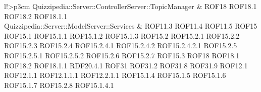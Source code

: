 \begin{tabella}{l!{\VRule}>{\centering\arraybackslash}p{3cm}}
Quizzipedia::Server::ControllerServer::TopicManager & ROF18 \linebreak ROF18.1 \linebreak ROF18.2 \linebreak ROF18.1.1 \\
Quizzipedia::Server::ModelServer::Services & ROF11.3 \linebreak ROF11.4 \linebreak ROF11.5 \linebreak ROF15 \linebreak ROF15.1 \linebreak ROF15.1.1 \linebreak ROF15.1.2 \linebreak ROF15.1.3 \linebreak ROF15.2 \linebreak ROF15.2.1 \linebreak ROF15.2.2 \linebreak ROF15.2.3 \linebreak ROF15.2.4 \linebreak ROF15.2.4.1 \linebreak ROF15.2.4.2 \linebreak ROF15.2.4.2.1 \linebreak ROF15.2.5 \linebreak ROF15.2.5.1 \linebreak ROF15.2.5.2 \linebreak ROF15.2.6 \linebreak ROF15.2.7 \linebreak ROF15.3 \linebreak ROF18 \linebreak ROF18.1 \linebreak ROF18.2 \linebreak ROF18.1.1 \linebreak RDF20.4.1 \linebreak ROF31 \linebreak ROF31.2 \linebreak ROF31.8 \linebreak ROF31.9 \linebreak ROF12.1 \linebreak ROF12.1.1 \linebreak ROF12.1.1.1 \linebreak ROF12.2.1.1 \linebreak ROF15.1.4 \linebreak ROF15.1.5 \linebreak ROF15.1.6 \linebreak ROF15.1.7 \linebreak ROF15.2.8 \linebreak ROF15.1.4.1 \\

\end{tabella}
